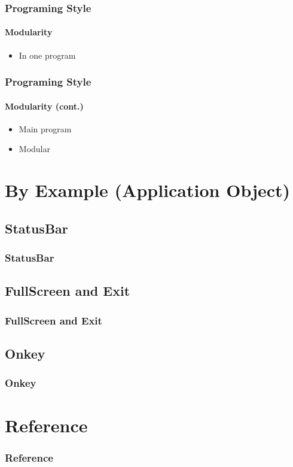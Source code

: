 \documentclass[13pt]{beamer}
\begin{document}
\begin{frame}[t]\frametitle{Programing Style}\framesubtitle{Modularity}
\begin{itemize}
	\item In one program
\end{itemize}
 
\end{frame}

\begin{frame}[t]\frametitle{Programing Style}\framesubtitle{Modularity (cont.)}
\begin{itemize}
	\item Main program
\end{itemize}
 
\begin{itemize}
	\item Modular
\end{itemize}
 

\end{frame}

\section{By Example (Application Object)}
\subsection{StatusBar}
\begin{frame}[t]\frametitle{StatusBar}
     
\end{frame}
\subsection{FullScreen and Exit}
\begin{frame}[t]\frametitle{FullScreen and Exit}
     
\end{frame}
\subsection{Onkey}
\begin{frame}[t]\frametitle{Onkey}
     
\end{frame}

\section*{Reference}
\begin{frame}[allowframebreaks]
	\frametitle{Reference}
	
	
	\nocite{*}
\end{frame}
\end{document}
